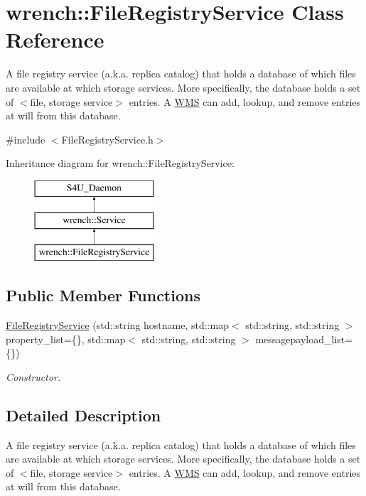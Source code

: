 \hypertarget{classwrench_1_1_file_registry_service}{}\section{wrench\+:\+:File\+Registry\+Service Class Reference}
\label{classwrench_1_1_file_registry_service}


A file registry service (a.\+k.\+a. replica catalog) that holds a database of which files are available at which storage services. More specifically, the database holds a set of $<$file, storage service$>$ entries. A \hyperlink{classwrench_1_1_w_m_s}{W\+MS} can add, lookup, and remove entries at will from this database.  




{\ttfamily \#include $<$File\+Registry\+Service.\+h$>$}

Inheritance diagram for wrench\+:\+:File\+Registry\+Service\+:\begin{figure}[H]
\begin{center}
\leavevmode
\includegraphics[height=3.000000cm]{classwrench_1_1_file_registry_service}
\end{center}
\end{figure}
\subsection*{Public Member Functions}
\begin{DoxyCompactItemize}
\item 
\hyperlink{classwrench_1_1_file_registry_service_ab5b1061fc26163f291e905c27bdbf114}{File\+Registry\+Service} (std\+::string hostname, std\+::map$<$ std\+::string, std\+::string $>$ property\+\_\+list=\{\}, std\+::map$<$ std\+::string, std\+::string $>$ messagepayload\+\_\+list=\{\})
\begin{DoxyCompactList}\small\item\em Constructor. \end{DoxyCompactList}\end{DoxyCompactItemize}


\subsection{Detailed Description}
A file registry service (a.\+k.\+a. replica catalog) that holds a database of which files are available at which storage services. More specifically, the database holds a set of $<$file, storage service$>$ entries. A \hyperlink{classwrench_1_1_w_m_s}{W\+MS} can add, lookup, and remove entries at will from this database. 

